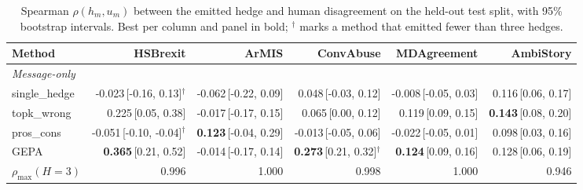 \begin{table}[t]
\centering
\small
\begin{tabular}{lrrrrr}
\hline
Method & HSBrexit & ArMIS & ConvAbuse & MDAgreement & AmbiStory \\
\hline
\multicolumn{6}{l}{\emph{Message-only}} \\
single\_hedge & -0.023{\scriptsize\,[-0.16, 0.13]}$^\dagger$ & -0.062{\scriptsize\,[-0.22, 0.09]} & 0.048{\scriptsize\,[-0.03, 0.12]} & -0.008{\scriptsize\,[-0.05, 0.03]} & 0.116{\scriptsize\,[0.06, 0.17]} \\
topk\_wrong & 0.225{\scriptsize\,[0.05, 0.38]} & -0.017{\scriptsize\,[-0.17, 0.15]} & 0.065{\scriptsize\,[0.00, 0.12]} & 0.119{\scriptsize\,[0.09, 0.15]} & \textbf{0.143}{\scriptsize\,[0.08, 0.20]} \\
pros\_cons & -0.051{\scriptsize\,[-0.10, -0.04]}$^\dagger$ & \textbf{0.123}{\scriptsize\,[-0.04, 0.29]} & -0.013{\scriptsize\,[-0.05, 0.06]} & -0.022{\scriptsize\,[-0.05, 0.01]} & 0.098{\scriptsize\,[0.03, 0.16]} \\
GEPA & \textbf{0.365}{\scriptsize\,[0.21, 0.52]} & -0.014{\scriptsize\,[-0.17, 0.14]} & \textbf{0.273}{\scriptsize\,[0.21, 0.32]}$^\dagger$ & \textbf{0.124}{\scriptsize\,[0.09, 0.16]} & 0.128{\scriptsize\,[0.06, 0.19]} \\
$\rho_{\max}(H{=}3)$ & 0.996 & 1.000 & 0.998 & 1.000 & 0.946 \\
\hline
\end{tabular}
\caption{Spearman $\rho(h_m,u_m)$ between the emitted hedge and human disagreement on the held-out test split, with 95\% bootstrap intervals. Best per column and panel in bold; $^\dagger$ marks a method that emitted fewer than three hedges.}
\label{tab:main}
\end{table}
